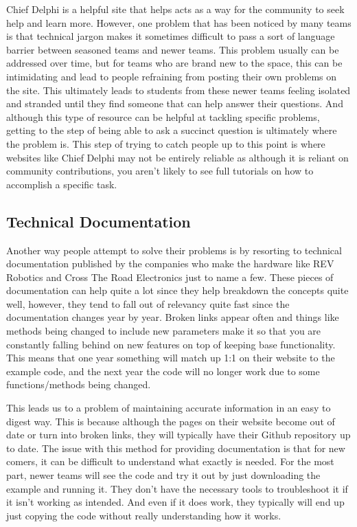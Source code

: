\documentclass[10pt,twocolumn]{article}
\begin{document}
Chief Delphi is a helpful site that helps acts as a way for the community to seek help and learn more. However, one problem that has been noticed by many teams is that technical jargon makes it sometimes difficult to pass a sort of language barrier between seasoned teams and newer teams. This problem usually can be addressed over time, but for teams who are brand new to the space, this can be intimidating and lead to people refraining from posting their own problems on the site. This ultimately leads to students from these newer teams feeling isolated and stranded until they find someone that can help answer their questions. And although this type of resource can be helpful at tackling specific problems, getting to the step of being able to ask a succinct question is ultimately where the problem is. This step of trying to catch people up to this point is where websites like Chief Delphi may not be entirely reliable as although it is reliant on community contributions, you aren't likely to see full tutorials on how to accomplish a specific task.



\subsection{Technical Documentation}
Another way people attempt to solve their problems is by resorting to technical documentation published by the companies who make the hardware like REV Robotics and Cross The Road Electronics just to name a few. These pieces of documentation can help quite a lot since they help breakdown the concepts quite well, however, they tend to fall out of relevancy quite fast since the documentation changes year by year. Broken links appear often and things like methods being changed to include new parameters make it so that you are constantly falling behind on new features on top of keeping base functionality. This means that one year something will match up 1:1 on their website to the example code, and the next year the code will no longer work due to some functions/methods being changed.

This leads us to a problem of maintaining accurate information in an easy to digest way. This is because although the pages on their website become out of date or turn into broken links, they will typically have their Github repository up to date. The issue with this method for providing documentation is that for new comers, it can be difficult to understand what exactly is needed. For the most part, newer teams will see the code and try it out by just downloading the example and running it. They don't have the necessary tools to troubleshoot it if it isn't working as intended. And even if it does work, they typically will end up just copying the code without really understanding how it works.
\end{document}
